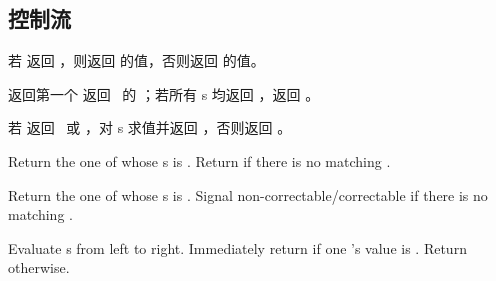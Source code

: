 \subsection{控制流}
\begin{LIST}{1cm}

  {
    若  返回 \T，则返回 
    的值，否则返回  的值。
  }

  {
  返回第一个  返回 \T\ 的
   ；若所有
  s 均返回 \NIL，返回 \NIL。
  }

  {
    若  返回 \T\ 或 \NIL，对 s
    求值并返回 ，否则返回 \retval{\NIL}。
  }

  {
    Return the  one of
    whose s is  . Return  if there is no matching .
  }

  {
    Return the  one of
    whose s is  .  Signal
    non-correctable/correctable  if there is no
    matching .
  }

  {
    Evaluate s from left to right. Immediately return
    \retval{\NIL} if one 's value is \NIL. Return
     otherwise.
  }


\end{LIST}

